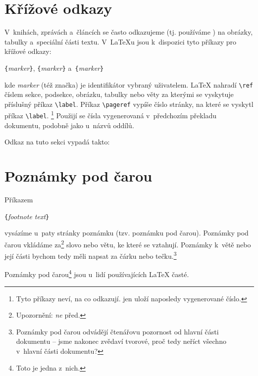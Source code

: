 \section{Křížové odkazy}

V~knihách, zprávách a~článcích se často odkazujeme (tj. používáme
) na obrázky, tabulky a~speciální části textu.
V~\LaTeX u jsou k~dispozici tyto příkazy pro křížové odkazy:

\begin{lscommand}
\verb|{|\emph{marker}\verb|}|, \verb|{|\emph{marker}\verb|}| 
a~\verb|{|\emph{marker}\verb|}|
\end{lscommand}
\noindent kde \emph{marker} (též značka) je identifikátor vybraný uživatelem. \LaTeX{}
nahradí \verb|\ref| číslem sekce, podsekce, obrázku, tabulky nebo věty
za kterými se vyskytuje příslušný příkaz \verb|\label|. Příkaz \verb|\pageref| vypíše
číslo stránky, na které se vyskytl příkaz \verb|\label|.%
\footnote{Tyto příkazy neví, na co odkazují.  jen uloží naposledy
vygenerované číslo.} Použijí se čísla vygenerovaná v~předchozím překladu
dokumentu, podobně jako u~názvů oddílů.

\begin{example}
Odkaz na tuto sekci
\label{sec:this} vypadá takto:
\end{example}
 
\section{Poznámky pod čarou}
Příkazem
\begin{lscommand}
\verb|{|\emph{footnote text}\verb|}|
\end{lscommand}
\noindent vysázíme u~paty stránky poznámku (tzv. poznámku pod čarou).
Poznámky pod čarou vkládáme za\footnote{Upozornění: \emph{ne} před.} slovo
nebo větu, ke které se vztahují. Poznámky k~větě nebo její části bychom tedy 
měli napsat za čárku nebo tečku.\footnote{Poznámky pod čarou odvádějí
čtenářovu pozornost od hlavní části dokumentu -- jsme nakonec zvědaví tvorové,
proč tedy neříct všechno v~hlavní části dokumentu?\footnotemark}

\begin{example}
Poznámky pod čarou\footnote{Toto
  je jedna z~nich.} jsou
  u~lidí používajících
\LaTeX{} časté.
\end{example}
 

